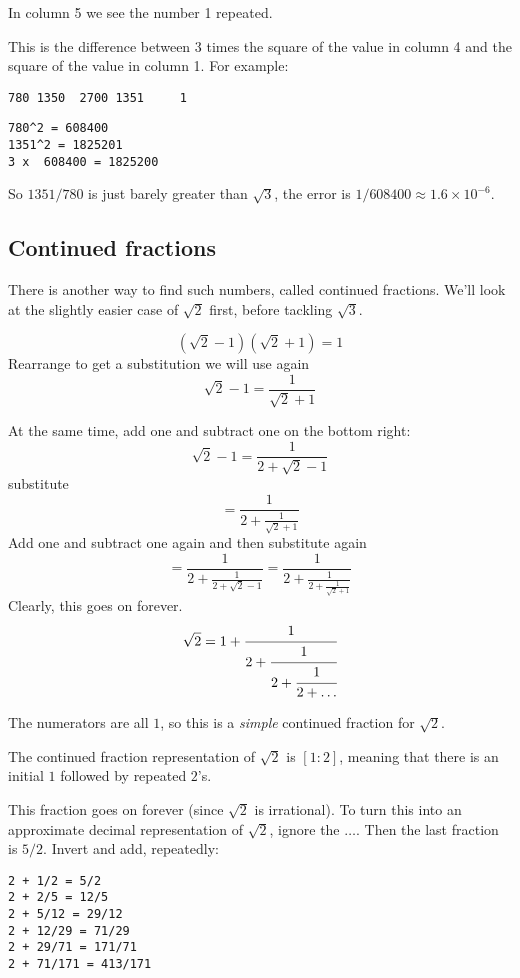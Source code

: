 \documentclass[11pt, oneside]{article}
\begin{document}
In column 5 we see the number 1 repeated.  

This is the difference between 3 times the square of the value in column 4 and the square of the value in column 1.  For example:

\begin{verbatim}
780 1350  2700 1351     1
\end{verbatim}

\begin{verbatim}
780^2 = 608400
1351^2 = 1825201
3 x  608400 = 1825200
\end{verbatim}

So $1351/780$ is just barely greater than $\sqrt{3}$, the error is $1/608400 \approx 1.6 \times 10^{-6}$.

\subsection*{Continued fractions}
There is another way to find such numbers, called continued fractions.  We'll look at the slightly easier case of $\sqrt{2}$ first, before tackling $\sqrt{3}$.

\[ (\sqrt{2} - 1)(\sqrt{2} + 1) = 1 \]
Rearrange to get a substitution we will use again
\[ \sqrt{2} - 1 = \frac{1}{\sqrt{2} + 1} \]

At the same time, add one and subtract one on the bottom right:
\[ \sqrt{2} - 1 =  \frac{1}{2 + \sqrt{2} - 1} \]
substitute
\[ = \frac{1}{2 + \frac{1}{\sqrt{2} + 1}} \]
Add one and subtract one again and then substitute again
\[ = \frac{1}{2 + \frac{1}{2 + \sqrt{2} - 1}} = \frac{1}{2 + \frac{1}{2 + \frac{1}{\sqrt{2} + 1} }} \]
Clearly, this goes on forever.
\[ \sqrt{2} = 1 + \cfrac{1}{2+\cfrac{1}{2+\cfrac{1}{2 + \dots}}}  \]

The numerators are all $1$, so this is a \emph{simple} continued fraction for $\sqrt{2}$.

The continued fraction representation of $\sqrt{2}$ is $[1:2]$, meaning that there is an initial $1$ followed by repeated $2$'s.

This fraction goes on forever (since $\sqrt{2}$ is irrational).  To turn this into an approximate decimal representation of $\sqrt{2}$, ignore the $\dots$.  Then the last fraction is $5/2$.  Invert and add, repeatedly:

\begin{verbatim}
2 + 1/2 = 5/2
2 + 2/5 = 12/5
2 + 5/12 = 29/12
2 + 12/29 = 71/29
2 + 29/71 = 171/71
2 + 71/171 = 413/171
\end{verbatim}
\end{document}

